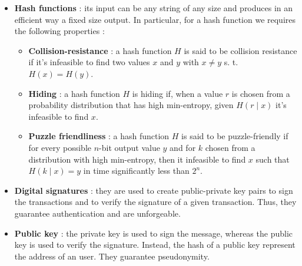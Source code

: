 \begin{itemize}
\item \textbf{Hash functions} : its input can be any string of any size and produces in an efficient way a fixed size output. In particular, for a hash function we requires the following properties :
\begin{itemize}
\item \textbf{Collision-resistance} : a hash function $H$ is said to be collision resistance if it's infeasible to find two values $x$ and $y$  with $x \neq y$ s. t. $H(x) = H(y)$.
\item \textbf{Hiding} : a hash function $H$ is hiding if, when a value $r$ is chosen from a probability distribution that has high min-entropy, given $H(r \mid x)$ it's infeasible to find $x$.
\item \textbf{Puzzle friendliness} : a hash function $H$ is said to be puzzle-friendly if for every possible $n$-bit output value $y$ and for $k$ chosen from a distribution with high min-entropy, then it infeasible to find $x$ such that $H(k \mid x) = y$ in time significantly less than $2^{n}$.
\end{itemize}
\item \textbf{Digital signatures} : they are used to create public-private key pairs to sign the transactions and to verify the signature of a given transaction. Thus, they guarantee authentication and are unforgeable.
\item \textbf{Public key} : the private key is used to sign the message, whereas the public key is used to verify the signature. Instead, the hash of a public key represent the address of an user. They guarantee pseudonymity.
\end{itemize}
